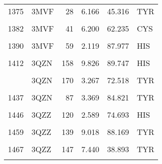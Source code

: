 \begin{table}
\begin{tabular}{llrrrl}
			1375 & 3MVF & 28 & 6.166 & 45.316 & TYR\\
			\cellcolor{gray!6}{1381} & \cellcolor{gray!6}{3MVF} & \cellcolor{gray!6}{40} & \cellcolor{gray!6}{7.066} & \cellcolor{gray!6}{4.606} & \cellcolor{gray!6}{TYR}\\
			1382 & 3MVF & 41 & 6.200 & 62.235 & CYS\\
			\addlinespace
			\cellcolor{gray!6}{1389} & \cellcolor{gray!6}{3MVF} & \cellcolor{gray!6}{58} & \cellcolor{gray!6}{7.239} & \cellcolor{gray!6}{83.767} & \cellcolor{gray!6}{TYR}\\
			1390 & 3MVF & 59 & 2.119 & 87.977 & HIS\\
			\cellcolor{gray!6}{1394} & \cellcolor{gray!6}{3MVF} & \cellcolor{gray!6}{69} & \cellcolor{gray!6}{8.541} & \cellcolor{gray!6}{55.944} & \cellcolor{gray!6}{TYR}\\
			1412 & 3QZN & 158 & 9.826 & 89.747 & HIS\\
			\cellcolor{gray!6}{1421} & \cellcolor{gray!6}{3QZN} & \cellcolor{gray!6}{168} & \cellcolor{gray!6}{7.173} & \cellcolor{gray!6}{70.767} & \cellcolor{gray!6}{HIS}\\
			\addlinespace
			1423 & 3QZN & 170 & 3.267 & 72.518 & TYR\\
			\cellcolor{gray!6}{1433} & \cellcolor{gray!6}{3QZN} & \cellcolor{gray!6}{83} & \cellcolor{gray!6}{2.699} & \cellcolor{gray!6}{67.495} & \cellcolor{gray!6}{HIS}\\
			1437 & 3QZN & 87 & 3.369 & 84.821 & TYR\\
			\cellcolor{gray!6}{1440} & \cellcolor{gray!6}{3QZZ} & \cellcolor{gray!6}{112} & \cellcolor{gray!6}{6.443} & \cellcolor{gray!6}{67.761} & \cellcolor{gray!6}{TYR}\\
			1446 & 3QZZ & 120 & 2.589 & 74.693 & HIS\\
			\addlinespace
			\cellcolor{gray!6}{1447} & \cellcolor{gray!6}{3QZZ} & \cellcolor{gray!6}{121} & \cellcolor{gray!6}{8.549} & \cellcolor{gray!6}{75.618} & \cellcolor{gray!6}{HIS}\\
			1459 & 3QZZ & 139 & 9.018 & 88.169 & TYR\\
			\cellcolor{gray!6}{1461} & \cellcolor{gray!6}{3QZZ} & \cellcolor{gray!6}{141} & \cellcolor{gray!6}{4.386} & \cellcolor{gray!6}{72.731} & \cellcolor{gray!6}{TYR}\\
			1467 & 3QZZ & 147 & 7.440 & 38.893 & TYR\\
			\cellcolor{gray!6}{1478} & \cellcolor{gray!6}{3QZZ} & \cellcolor{gray!6}{69} & \cellcolor{gray!6}{10.498} & \cellcolor{gray!6}{44.008} & \cellcolor{gray!6}{HIS}\\

\end{tabular}
\end{table}
